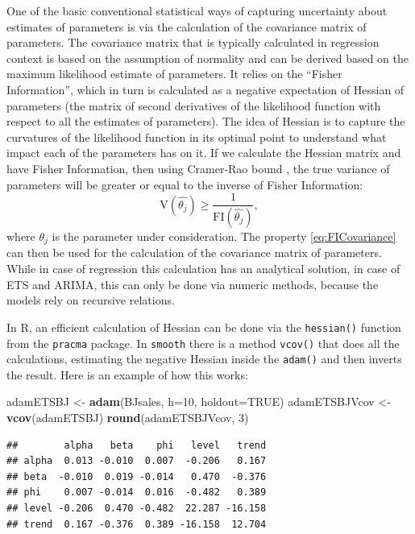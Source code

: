 \documentclass[]{book}
\newenvironment{Shaded}{\begin{snugshade}}{\end{snugshade}}
\newcommand{\DataTypeTok}[1]{\textcolor[rgb]{0.13,0.29,0.53}{#1}}
\newcommand{\DecValTok}[1]{\textcolor[rgb]{0.00,0.00,0.81}{#1}}
\newcommand{\KeywordTok}[1]{\textcolor[rgb]{0.13,0.29,0.53}{\textbf{#1}}}
\newcommand{\NormalTok}[1]{#1}
\newcommand{\OtherTok}[1]{\textcolor[rgb]{0.56,0.35,0.01}{#1}}
\newcommand{\StringTok}[1]{\textcolor[rgb]{0.31,0.60,0.02}{#1}}
\theoremstyle{definition}
\theoremstyle{definition}
\theoremstyle{definition}
\theoremstyle{definition}
\theoremstyle{remark}
\begin{document}
One of the basic conventional statistical ways of capturing uncertainty about estimates of parameters is via the calculation of the covariance matrix of parameters. The covariance matrix that is typically calculated in regression context is based on the assumption of normality and can be derived based on the maximum likelihood estimate of parameters. It relies on the ``Fisher Information'', which in turn is calculated as a negative expectation of Hessian of parameters (the matrix of second derivatives of the likelihood function with respect to all the estimates of parameters). The idea of Hessian is to capture the curvatures of the likelihood function in its optimal point to understand what impact each of the parameters has on it. If we calculate the Hessian matrix and have Fisher Information, then using Cramer-Rao bound \citep{WikipediaCramerRaoBound}, the true variance of parameters will be greater or equal to the inverse of Fisher Information:
\begin{equation}
    \mathrm{V}(\hat{\theta_j}) \geq \frac{1}{\mathrm{FI}(\hat{\theta_j})} ,
    \label{eq:FICovariance}
\end{equation}
where \(\theta_j\) is the parameter under consideration. The property \eqref{eq:FICovariance} can then be used for the calculation of the covariance matrix of parameters. While in case of regression this calculation has an analytical solution, in case of ETS and ARIMA, this can only be done via numeric methods, because the models rely on recursive relations.

In R, an efficient calculation of Hessian can be done via the \texttt{hessian()} function from the \texttt{pracma} package. In \texttt{smooth} there is a method \texttt{vcov()} that does all the calculations, estimating the negative Hessian inside the \texttt{adam()} and then inverts the result. Here is an example of how this works:

\begin{Shaded}
\begin{Highlighting}[]
\NormalTok{adamETSBJ <-}\StringTok{ }\KeywordTok{adam}\NormalTok{(BJsales, }\DataTypeTok{h=}\DecValTok{10}\NormalTok{, }\DataTypeTok{holdout=}\OtherTok{TRUE}\NormalTok{)}
\NormalTok{adamETSBJVcov <-}\StringTok{ }\KeywordTok{vcov}\NormalTok{(adamETSBJ)}
\KeywordTok{round}\NormalTok{(adamETSBJVcov, }\DecValTok{3}\NormalTok{)}
\end{Highlighting}
\end{Shaded}

\begin{verbatim}
##        alpha   beta    phi   level   trend
## alpha  0.013 -0.010  0.007  -0.206   0.167
## beta  -0.010  0.019 -0.014   0.470  -0.376
## phi    0.007 -0.014  0.016  -0.482   0.389
## level -0.206  0.470 -0.482  22.287 -16.158
## trend  0.167 -0.376  0.389 -16.158  12.704
\end{verbatim}
\end{document}
